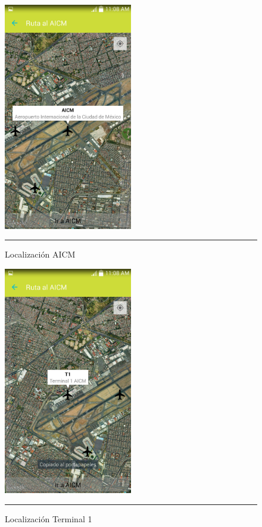 \begin{figure}[h]
	\centering
		\includegraphics[width=0.5\textwidth]{Figuras/locaicm.png}
		\rule{30em}{0.5pt}
	\caption[Localización AICM]{Localización AICM}
	\label{fig:localizacionAICM}
\end{figure}

\begin{figure}[h]
	\centering
		\includegraphics[width=0.5\textwidth]{Figuras/loct1.png}
		\rule{30em}{0.5pt}
	\caption[Localización Terminal 1]{Localización Terminal 1}
	\label{fig:localizacionT1}
\end{figure}


